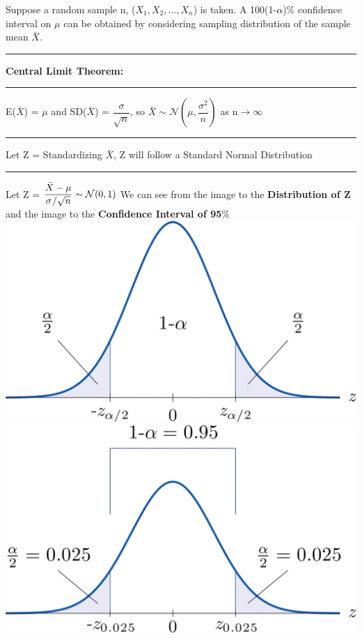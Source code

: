 \documentclass[]{article}
\begin{document}
\newline Suppose a random sample n, ($X_1, X_2,...,X_n$) is taken.
\newline A 100(1-$\alpha$)$\%$ confidence interval on $\mu$ can be obtained by considering sampling distribution of the sample mean $\bar{X}$.
\newline
\newline\Large\rule{1.3cm}{0pt}\textbf{Central Limit Theorem:} 
\newline\Large\rule{1.3cm}{0pt} E($\bar{X}$) = $\mu$ and SD($\bar{X}$) = $\dfrac{\sigma}{\sqrt{n}}$, so $\bar{X} \sim \mathcal{N}(\mu, \dfrac{\sigma ^2}{ n })  $ as n$\to \infty$
\newline
\newline \Large\rule{1.3cm}{0pt} Let Z = Standardizing $\bar{X}$, Z will follow a Standard Normal Distribution
\newline 
\newline\Large\rule{1.3cm}{0pt} Let Z = $\dfrac{\bar{X} - \mu}{\sigma \\/ \sqrt{n} } \sim \mathcal{N}(0, 1) $
\newline 
\newline We can see from the image to the  \textbf{Distribution of Z} and the image to the  \textbf{Confidence Interval of 95$\%$}
\newline
\includegraphics[scale=0.7]{distribution_of_Z}
\includegraphics[scale=0.7]{ci_95}
\end{document}
